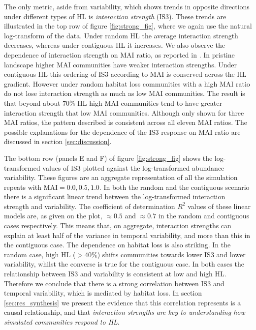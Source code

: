 The only metric, aside from variability, which shows trends in opposite directions under different types of HL is \emph{interaction strength} (IS3). These trends are illustrated in the top row of figure \ref{fig:strong_fig}, where we again use the natural log-transform of the data. Under random HL the average interaction strength decreases, whereas under contiguous HL it increases. We also observe the dependence of interaction strength on MAI ratio, as reported in \cite{lurgi2015effects}. In pristine landscape higher MAI communities have weaker interaction strengths. Under contiguous HL this ordering of IS3 according to MAI is conserved across the HL gradient. However under random habitat loss communities with a high MAI ratio do not lose interaction strength as much as low MAI communities. The result is that beyond about $70\%$ HL high MAI communities tend to have greater interaction strength that low MAI communities. Although only shown for three MAI ratios, the pattern described is consistent across all eleven MAI ratios. The possible explanations for the dependence of the IS3 response on MAI ratio are discussed in section \ref{sec:discussion}.

The bottom row (panels E and F) of figure \ref{fig:strong_fig} shows the log-transformed values of IS3 plotted against the log-transformed abundance variability. These figures are an aggregate representation of all the simulation repeats with MAI$=0.0,0.5,1.0$. In both the random and the contiguous scenario there is a significant linear trend between the log-transformed interaction strength and variability. The coefficient of determination $R^2$ values of these linear models are, as given on the plot, $\approx 0.5$ and $\approx 0.7$ in the random and contiguous cases respectively. This means that, on aggregate, interaction strengths can explain at least half of the variance in temporal variability, and more than this in the contiguous case. The dependence on habitat loss is also striking. In the random case, high HL ($>40\%$) shifts communities towards lower IS3 and lower variability, whilst the converse is true for the contiguous case. In both cases the relationship between IS3 and variability is consistent at low and high HL. Therefore we conclude that there is a strong correlation between IS3 and temporal variability, which is mediated by habitat loss. In section \ref{sec:res_synthesis} we present the evidence that this correlation represents is a causal relationship, and that \emph{interaction strengths are key to understanding how simulated communities respond to HL}.   

